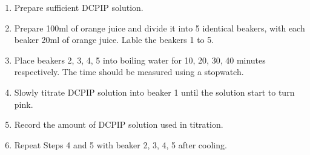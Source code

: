 \documentclass[a4paper]{article}
\begin{document}
\begin{enumerate}
    \item Prepare sufficient DCPIP solution.
    \item Prepare 100ml of orange juice and divide it into 5 identical beakers, with each beaker 20ml of orange juice. Lable the beakers 1 to 5.
    \item Place beakers 2, 3, 4, 5 into boiling water for 10, 20, 30, 40 minutes respectively. The time should be measured using a stopwatch.
    \item Slowly titrate DCPIP solution into beaker 1 until the solution start to turn pink. 
    \item Record the amount of DCPIP solution used in titration. 
    \item Repeat Steps 4 and 5 with beaker 2, 3, 4, 5 after cooling.
\end{enumerate}


\clearpage


\end{document}

